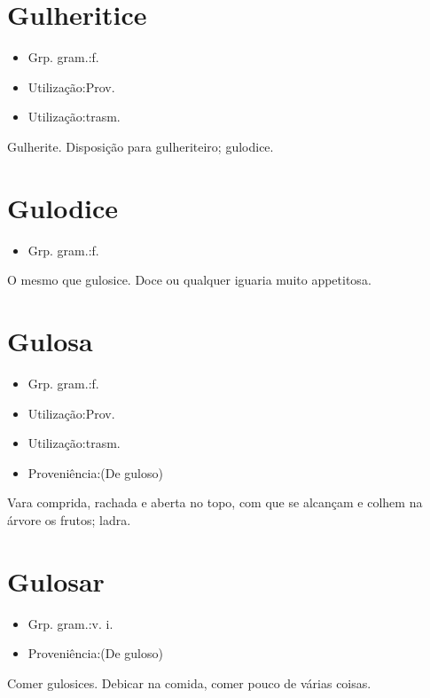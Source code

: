 \section{Gulheritice}
\begin{itemize}
\item {Grp. gram.:f.}
\end{itemize}
\begin{itemize}
\item {Utilização:Prov.}
\end{itemize}
\begin{itemize}
\item {Utilização:trasm.}
\end{itemize}
Gulherite.
Disposição para gulheriteiro; gulodice.
\section{Gulodice}
\begin{itemize}
\item {Grp. gram.:f.}
\end{itemize}
O mesmo que \textunderscore gulosice\textunderscore .
Doce ou qualquer iguaria muito appetitosa.
\section{Gulosa}
\begin{itemize}
\item {Grp. gram.:f.}
\end{itemize}
\begin{itemize}
\item {Utilização:Prov.}
\end{itemize}
\begin{itemize}
\item {Utilização:trasm.}
\end{itemize}
\begin{itemize}
\item {Proveniência:(De \textunderscore guloso\textunderscore )}
\end{itemize}
Vara comprida, rachada e aberta no topo, com que se alcançam e colhem na árvore os frutos; ladra.
\section{Gulosar}
\begin{itemize}
\item {Grp. gram.:v. i.}
\end{itemize}
\begin{itemize}
\item {Proveniência:(De \textunderscore guloso\textunderscore )}
\end{itemize}
Comer gulosices.
Debicar na comida, comer pouco de várias coisas.
